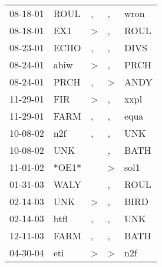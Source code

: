 \begin{supertabular}{p{0.07\textwidth}p{0.06\textwidth}p{0.02\textwidth}p{0.02\textwidth}p{0.06\textwidth}}
 08-18-01\textsuperscript{} &  ROUL\textsuperscript{} &             , &             , &  wron\textsuperscript{} \\
 08-18-01\textsuperscript{} &   EX1\textsuperscript{} &  \textgreater &             , &  ROUL\textsuperscript{} \\
 08-23-01\textsuperscript{} &  ECHO\textsuperscript{} &             , &             , &  DIVS\textsuperscript{} \\
 08-24-01\textsuperscript{} &  abiw\textsuperscript{} &  \textgreater &             , &  PRCH\textsuperscript{} \\
 08-24-01\textsuperscript{} &  PRCH\textsuperscript{} &             , &  \textgreater &  ANDY\textsuperscript{} \\
 11-29-01\textsuperscript{} &   FIR\textsuperscript{} &  \textgreater &             , &  xxpl\textsuperscript{} \\
 11-29-01\textsuperscript{} &  FARM\textsuperscript{} &             , &             , &  equa\textsuperscript{} \\
 10-08-02\textsuperscript{} &   n2f\textsuperscript{} &             , &             , &   UNK\textsuperscript{} \\
 10-08-02\textsuperscript{} &   UNK\textsuperscript{} &               &             , &  BATH\textsuperscript{} \\
 11-01-02\textsuperscript{} &                   *OE1* &               &  \textgreater &  sol1\textsuperscript{} \\
 01-31-03\textsuperscript{} &  WALY\textsuperscript{} &               &             , &  ROUL\textsuperscript{} \\
 02-14-03\textsuperscript{} &   UNK\textsuperscript{} &  \textgreater &             , &  BIRD\textsuperscript{} \\
 02-14-03\textsuperscript{} &  btfl\textsuperscript{} &             , &             , &   UNK\textsuperscript{} \\
 12-11-03\textsuperscript{} &  FARM\textsuperscript{} &             , &             , &  BATH\textsuperscript{} \\
 04-30-04\textsuperscript{} &   eti\textsuperscript{} &  \textgreater &  \textgreater &   n2f\textsuperscript{} \\
\end{supertabular}
